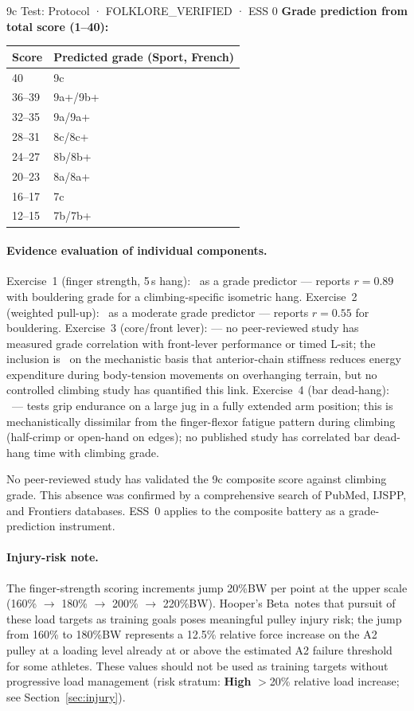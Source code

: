 \begin{folklorebox}{9c Test: Protocol · FOLKLORE\_VERIFIED · ESS 0}
\medskip
\noindent\textbf{Grade prediction from total score (1--40):}
\smallskip

\begin{tabular}{ll}
\toprule
\textbf{Score} & \textbf{Predicted grade (Sport, French)} \\
\midrule
40 & 9c \\
36--39 & 9a+/9b+ \\
32--35 & 9a/9a+ \\
28--31 & 8c/8c+ \\
24--27 & 8b/8b+ \\
20--23 & 8a/8a+ \\
16--17 & 7c \\
12--15 & 7b/7b+ \\
\bottomrule
\end{tabular}
\end{folklorebox}

\paragraph{Evidence evaluation of individual components.}
Exercise~1 (finger strength, 5\,s hang): \evidencebacked\ as a grade predictor --- \cite{BBW25} reports $r = 0.89$ with bouldering grade for a climbing-specific isometric hang. Exercise~2 (weighted pull-up): \evidencebacked\ as a moderate grade predictor --- \cite{BBW25} reports $r = 0.55$ for bouldering. Exercise~3 (core/front lever): \toverify --- no peer-reviewed study has measured grade correlation with front-lever performance or timed L-sit; the inclusion is \bioplausible\ on the mechanistic basis that anterior-chain stiffness reduces energy expenditure during body-tension movements on overhanging terrain, but no controlled climbing study has quantified this link. Exercise~4 (bar dead-hang): \toverify\ --- tests grip endurance on a large jug in a fully extended arm position; this is mechanistically dissimilar from the finger-flexor fatigue pattern during climbing (half-crimp or open-hand on edges); no published study has correlated bar dead-hang time with climbing grade.

No peer-reviewed study has validated the 9c composite score against climbing grade. This absence was confirmed by a comprehensive search of PubMed, IJSPP, and Frontiers databases. ESS~0 applies to the composite battery as a grade-prediction instrument.

\paragraph{Injury-risk note.}
The finger-strength scoring increments jump 20\%BW per point at the upper scale (160\% $\to$ 180\% $\to$ 200\% $\to$ 220\%BW). Hooper's Beta\singlesource\ notes that pursuit of these load targets as training goals poses meaningful pulley injury risk; the jump from 160\% to 180\%BW represents a 12.5\% relative force increase on the A2 pulley at a loading level already at or above the estimated A2 failure threshold for some athletes. These values should not be used as training targets without progressive load management (risk stratum: \textbf{High} $>$20\% relative load increase; see Section~\ref{sec:injury}).

